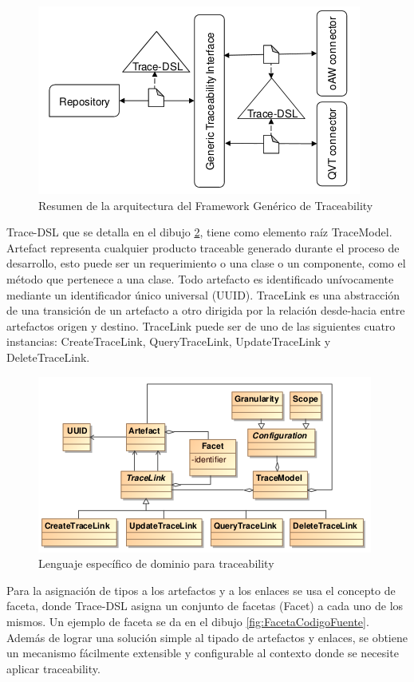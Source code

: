 \documentclass[a4paper,12pt,oneside]{book}
\begin{document}
\begin{figure}[hbtp]
\centering
\includegraphics[scale=.7]{./img/GenericTraceFrame_Arquitectura}
\caption{Resumen de la arquitectura del Framework Genérico de Traceability}
\label{fig:GenericoArquitectura}
\end{figure}


Trace-DSL que se detalla en el dibujo \ref{fig:DSLTrace}, tiene como elemento raíz TraceModel. Artefact representa cualquier producto traceable generado durante el proceso de desarrollo, esto puede ser un requerimiento o una clase o un componente, como el método que pertenece a una clase. Todo artefacto es identificado unívocamente mediante un identificador único universal (UUID). TraceLink es una abstracción de una transición de un artefacto a otro dirigida por la relación desde-hacia entre artefactos origen y destino. TraceLink puede ser de uno de las siguientes cuatro instancias: CreateTraceLink, QueryTraceLink, UpdateTraceLink y DeleteTraceLink.


\begin{figure}[hbtp]
\centering
\includegraphics[scale=.8]{./img/Trace-DSL}
\caption{Lenguaje específico de dominio para traceability}
\label{fig:DSLTrace}
\end{figure}

Para la asignación de tipos a los artefactos y a los enlaces se usa el concepto de faceta, donde Trace-DSL asigna un conjunto de facetas (Facet) a cada uno de los mismos. Un ejemplo de faceta se da en el dibujo \ref{fig:FacetaCodigoFuente}. Además de lograr una solución simple al tipado de artefactos y enlaces, se obtiene un mecanismo fácilmente extensible y configurable al contexto donde se necesite aplicar traceability.
\end{document}

